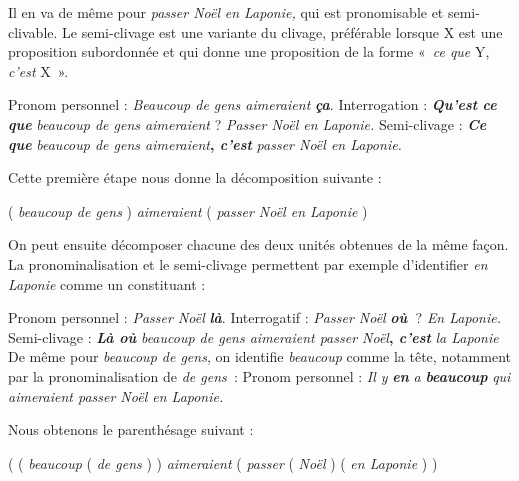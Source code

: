 Il en va de même pour \textit{passer Noël} \textit{en Laponie,} qui est pronomisable et semi-clivable. Le semi-clivage est une variante du clivage, préférable lorsque X est une proposition subordonnée et qui donne une proposition de la forme «~\textit{ce que}
Y, \textit{c'est} X~».

\ea
  \ea Pronom personnel : \textit{Beaucoup de gens aimeraient} \textbf{\textit{ça}}.
  \ex Interrogation : \textbf{\textit{Qu’est} \textit{ce que}} \textit{beaucoup de gens aimeraient} ? \textit{Passer Noël en Laponie.}
  \ex Semi-clivage : \textbf{\textit{Ce que}} \textit{beaucoup de gens aimeraient}\textbf{, \textit{c’est}} \textit{passer Noël en Laponie.}
\z\z

Cette première étape nous donne la décomposition suivante :

\ea
   ( \textit{beaucoup de gens} ) \textit{aimeraient} ( \textit{passer Noël en Laponie} )
\z

On peut ensuite décomposer chacune des deux unités obtenues de la même façon. La pronominalisation et le semi-clivage permettent par exemple d’identifier \textit{en Laponie} comme un constituant :

\ea
\ea Pronom personnel : \textit{Passer Noël} \textbf{\textit{là}}.
\ex Interrogatif : \textit{Passer Noël} \textbf{\textit{où~}}? \textit{En Laponie.}
\ex Semi-clivage :  \textbf{\textit{Là où}} \textit{beaucoup de gens aimeraient passer Noël}\textbf{, \textit{c’est}} \textit{la Laponie}
\z\z
De même pour \textit{beaucoup de gens}, on identifie \textit{beaucoup} comme la tête, notamment par la pronominalisation de \textit{de gens~}:
\ea
Pronom personnel : \textit{Il y} \textbf{\textit{en}} \textit{a} \textbf{\textit{beaucoup}} \textit{qui aimeraient passer Noël en Laponie.}    
\z

Nous obtenons le parenthésage suivant :

\ea
      ( ( \textit{beaucoup}  ( \textit{de gens} ) )  \textit{aimeraient}  ( \textit{passer}  ( \textit{Noël} ) ( \textit{en Laponie} ) )
\z

